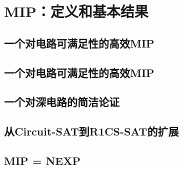 \chapter{MIP：定义和基本结果}\label{chp:08MIP}
\section{一个对电路可满足性的高效MIP}\label{8.1}
\section{一个对电路可满足性的高效MIP}\label{8.2}
\section{一个对深电路的简洁论证}\label{8.3}
\section{从Circuit-SAT到R1CS-SAT的扩展}\label{8.4}
\section{MIP = NEXP}\label{8.5}